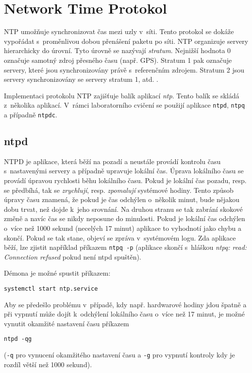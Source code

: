 
\section{Network Time Protokol}
\label{ntp}
NTP \cite{rfc1305} umožňuje synchronizovat čas mezi uzly v~síti. Tento protokol se dokáže
vypořádat s~proměnlivou dobou přenášení paketu po síti. NTP organizuje servery hierarchicky do úrovní.
Tyto úrovně se nazývají {\em stratum}. Nejnižší hodnota 0 označuje samotný zdroj přesného času (např.
GPS). Stratum 1 pak označuje servery, které jsou synchronizovány právě s~referenčním zdrojem. Stratum 2
jsou servery synchronizovány se servery stratum 1, atd. \cite{rfc5905}.

Implementaci protokolu NTP zajišťuje balík aplikací {\em ntp}. Tento balík se skládá z~několika
aplikací. V~rámci laboratorního cvičení se použijí aplikace {\tt ntpd}, {\tt ntpq} a případně {\tt ntpdc}.

\subsection{ntpd}
NTPD je aplikace, která běží na pozadí a neustále provádí kontrolu času s~nastavenými servery a případně upravuje lokální čas. Úprava lokálního času se provádí úpravou rychlosti běhu lokálního času. Pokud je lokální čas pozadu, resp. se předbíhá, tak se {\em zrychlují}, resp. {\em zpomalují} systémové hodiny. Tento způsob úpravy času znamená, že pokud je čas odchýlen o~několik minut, bude nějakou dobu trvat, než dojde k~jeho srovnání. Na druhou stranu se tak zabrání skokové změně a navíc čas se nikdy neposune do minulosti. Pokud je lokální čas odchýlen o~více než 1000 sekund (necelých 17 minut) aplikace to vyhodnotí jako chybu a skončí. Pokud se tak stane, objeví se zpráva v~systémovém logu. Zda aplikace běží, lze zjistit například příkazem {\tt ntpq -p} (aplikace skončí s~hláškou {\em ntpq: read: Connection refused} pokud není ntpd spuštěn).

Démona je možné spustit příkazem:
\begin{verbatim}
systemctl start ntp.service
\end{verbatim}
Aby se předešlo problému v~případě, kdy např. hardwarové hodiny jdou špatně a při vypnutí může dojít k~odchýlení lokálního času o~více než 17 minut, je možné vynutit okamžité nastavení času příkazem
\begin{verbatim}
ntpd -qg
\end{verbatim}
({\tt -q} pro vynucení okamžitého nastavení času a {\tt -g} pro vypnutí kontroly kdy je rozdíl větší než 1000 sekund).

